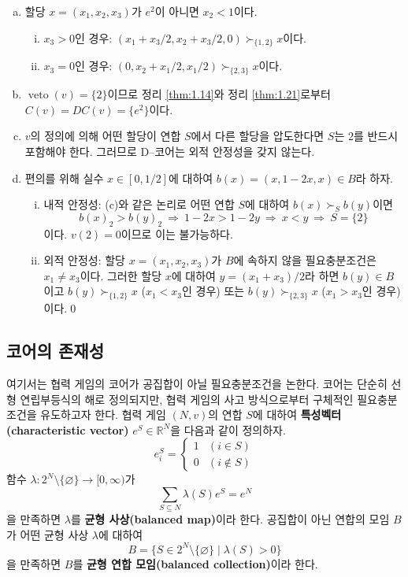 \documentclass{article}
\numberwithin{equation}{section}
\begin{document}
\begin{sol}
	\begin{enumerate}[(a)]
		\item 할당 $x=(x_1,x_2,x_3)$가 $e^2$이 아니면 $x_2<1$이다.
			\begin{enumerate}[(i)]
				\item $x_3>0$인 경우: $(x_1+x_3/2,x_2+x_3/2,0)\succ_{\{1,2\}}x$이다.
				\item $x_3=0$인 경우: $(0,x_2+x_1/2,x_1/2)\succ_{\{2,3\}}x$이다.
			\end{enumerate}
		\item $\operatorname{veto}(v)=\{2\}$이므로 정리 \ref{thm:1.14}와 정리 \ref{thm:1.21}로부터 $C(v)=DC(v)=\{e^2\}$이다.
		\item $v$의 정의에 의해 어떤 할당이 연합 $S$에서 다른 할당을 압도한다면 $S$는 $2$를 반드시 포함해야 한다. 그러므로 D--코어는 외적 안정성을 갖지 않는다.
		\item 편의를 위해 실수 $x\in[0,1/2]$에 대하여 $b(x)=(x,1-2x,x)\in B$라 하자.
			\begin{enumerate}[(i)]
				\item 내적 안정성: (c)와 같은 논리로 어떤 연합 $S$에 대하여 $b(x)\succ_Sb(y)$이면
					\[
							b(x)_2>b(y)_2~\Longrightarrow~1-2x>1-2y~\Longrightarrow~x<y~\Longrightarrow~ S=\{2\}
					\]
					이다. $v(2)=0$이므로 이는 불가능하다.
				\item 외적 안정성: 할당 $x=(x_1,x_2,x_3)$가 $B$에 속하지 않을 필요충분조건은 $x_1\ne x_3$이다. 그러한 할당 $x$에 대하여 $y=(x_1+x_3)/2$라 하면 $b(y)\in B$이고 $b(y)\succ_{\{1,2\}}x$ ($x_1<x_3$인 경우) 또는 $b(y)\succ_{\{2,3\}}x$ ($x_1>x_3$인 경우)이다.\qed
			\end{enumerate}
	\end{enumerate}
\end{sol}

\subsection{코어의 존재성}
\label{subsection:1.5}
여기서는 협력 게임의 코어가 공집합이 아닐 필요충분조건을 논한다. 코어는 단순히 선형 연립부등식의 해로 정의되지만, 협력 게임의 사고 방식으로부터 구체적인 필요충분조건을 유도하고자 한다. 협력 게임 $(N,v)$의 연합 $S$에 대하여 \textbf{특성벡터(characteristic vector)} $e^S\in\mathbb R^N$을 다음과 같이 정의하자.
\[
	e^S_i=\begin{cases}
		1 & (i\in S)\\
		0 & (i\notin S)
	\end{cases}
\]
함수 $\lambda:2^N\setminus\{\varnothing\}\to[0,\infty)$가
\[
	\sum_{S\subseteq N}\lambda(S)e^S=e^N
\]
을 만족하면 $\lambda$를 \textbf{균형 사상(balanced map)}이라 한다. 공집합이 아닌 연합의 모임 $B$가 어떤 균형 사상 $\lambda$에 대하여
\[
	B=\{S\in 2^N\setminus\{\varnothing\}\mid\lambda(S)>0\}
\]
을 만족하면 $B$를 \textbf{균형 연합 모임(balanced collection)}이라 한다.
\end{document}
